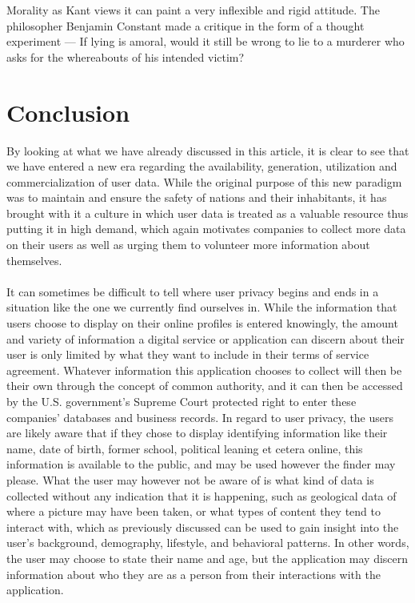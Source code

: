 \documentclass[11pt]{article}
\begin{document}
Morality as Kant views it can paint a very inflexible and rigid attitude. The philosopher Benjamin Constant made a critique in the form of a thought experiment --- If lying is amoral, would it still be wrong to lie to a murderer who asks for the whereabouts of his intended victim? 
\\
\section{Conclusion}
By looking at what we have already discussed in this article, it is clear to see that we have entered a new era regarding the availability, generation, utilization and commercialization of user data. While the original purpose of this new paradigm was to maintain and ensure the safety of nations and their inhabitants, it has brought with it a culture in which user data is treated as a valuable resource thus putting it in high demand, which again motivates companies to collect more data on their users as well as urging them to volunteer more information about themselves.
\\ \\
It can sometimes be difficult to tell where user privacy begins and ends in a situation like the one we currently find ourselves in. While the information that users choose to display on their online profiles is entered knowingly, the amount and variety of information a digital service or application can discern about their user is only limited by what they want to include in their terms of service agreement. Whatever information this application chooses to collect will then be their own through the concept of common authority, and it can then be accessed by the U.S. government’s Supreme Court protected right to enter these companies’ databases and business records. In regard to user privacy, the users are likely aware that if they chose to display identifying information like their name, date of birth, former school, political leaning et cetera online, this information is available to the public, and may be used however the finder may please. What the user may however not be aware of is what kind of data is collected without any indication that it is happening, such as geological data of where a picture may have been taken, or what types of content they tend to interact with, which as previously discussed can be used to gain insight into the user’s background, demography, lifestyle, and behavioral patterns. In other words, the user may choose to state their name and age, but the application may discern information about who they are as a person from their interactions with the application.
\end{document}
